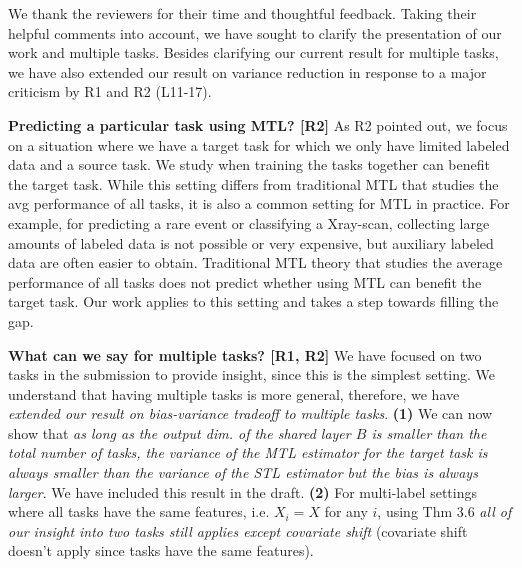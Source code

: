 \documentclass{article}
\begin{document}
We thank the reviewers for their time and thoughtful feedback.
Taking their helpful comments into account, we have sought to clarify the presentation of our work and  multiple tasks. %
Besides clarifying our current result for multiple tasks, we have also extended our result on variance reduction in response to a major criticism by R1 and R2 (L11-17).


\vspace{-0.02in}
\textbf{Predicting a particular task using MTL? [R2]}
As R2 pointed out, we focus on a situation where we have a target task for which we only have limited labeled data and a source task.
We study when training the tasks together can benefit the target task.
While this setting differs from traditional MTL that studies the avg performance of all tasks, it is also a common setting for MTL in practice.
For example, for predicting a rare event or classifying a Xray-scan, collecting large amounts of labeled data is not possible or very expensive, but auxiliary labeled data are often easier to obtain.
Traditional MTL theory that studies the average performance of all tasks does not predict whether using MTL can benefit the target task.
Our work applies to this setting and takes a step towards filling the gap.


\vspace{-0.025in}
\textbf{What can we say for multiple tasks? [R1, R2]}
We have focused on two tasks in the submission to provide insight, since this is the simplest setting.
We understand that having multiple tasks is more general, therefore, we have \textit{extended our result on bias-variance tradeoff to multiple tasks}.
\textbf{(1)} We can now show that \textit{as long as the output dim. of the shared layer $B$ is smaller than the total number of tasks, the variance of the MTL estimator for the target task is always smaller than the variance of the STL estimator but the bias is always larger}.
We have included this result in the draft.
\textbf{(2)} For multi-label settings where all tasks have the same features, i.e. $X_i = X$ for any $i$, using Thm 3.6 \textit{all of our insight into two tasks still applies except covariate shift} (covariate shift doesn't apply since tasks have the same features).
\end{document}
